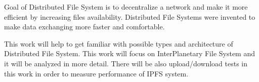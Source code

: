 Goal of Distributed File System is to decentralize a network and make it more efficient by increasing files availability. Distributed File Systems were invented to make data exchanging more faster and comfortable.

This work will help to get familiar with possible types and architecture of Distributed File System. This work will focus on InterPlanetary File System and it will be analyzed in more detail. There will be also upload/download tests in this work in order to measure performance of IPFS system.